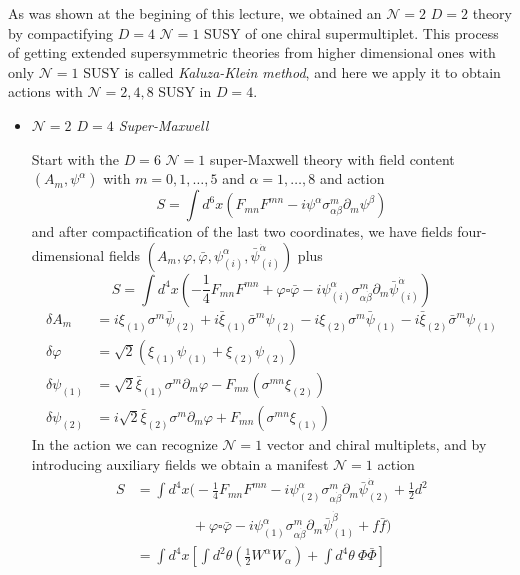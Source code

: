 \documentclass[a4paper,12pt]{article}
\numberwithin{equation}{section}
\numberwithin{exe}{section}
\newcommand{\p}{{\partial}}
\renewcommand{\a}{{\alpha}}
\newcommand{\ad}{{\dot\alpha}}
\renewcommand{\b}{{\beta}}
\newcommand{\bd}{{\dot\beta}}
\renewcommand{\d}{{\delta}}
\newcommand{\s}{{\sigma}}
\renewcommand{\sb}{{\bar\sigma}}
\renewcommand{\t}{{\theta}}
\newcommand{\vphi}{{\varphi}}
\newcommand{\vphib}{{\bar\varphi}}
\newcommand{\xib}{{\bar\xi}}
\newcommand{\Phib}{{\bar \Phi}}
\newcommand{\psib}{{\bar\psi}}
\begin{document}
As was shown at the begining of this lecture, we obtained an $\mathcal N=2$ $D=2$ theory by compactifying $D=4$ $\mathcal N=1$ SUSY of one chiral supermultiplet. This process of getting extended supersymmetric theories from higher dimensional ones with only $\mathcal N=1$ SUSY is called {\it Kaluza-Klein method}, and here we apply it to obtain actions with $\mathcal N=2,4,8$ SUSY in $D=4$.

	\begin{itemize}
	\item {\it $\mathcal N =2$ $D=4$ Super-Maxwell}
	
	Start with the $D=6$ $\mathcal N=1$ super-Maxwell theory with field content $(A_m, \psi^\a)$ with $m=0,1,\ldots,5$ and $\a =1,\ldots, 8$ and action
	\begin{equation}
	S = \int d^6x (F_{mn} F^{mn} -i\psi^\a \s^m_{\a\b} \p_m \psi^\b)
	\end{equation}
	and after compactification of the last two coordinates, we have fields four-dimensional fields $(A_m, \vphi,\vphib, \psi^\a_{(i)},\psib^\ad_{(i)})$ plus
	\begin{equation}
	S = \int d^4x (-\frac14 F_{mn}F^{mn} + \vphi\square \vphib - i \psi^\a_{(i)}\s^m_{\a\bd} \p_m \psib^\ad_{(i)})
	\end{equation}
	\begin{equation}\label{extsusy}
		\begin{aligned}
		\d A_m & = i\xi_{(1)} \s^m \psib_{(2)} + i\xib_{(1)}\sb^m \psi_{(2)} - i\xi_{(2)}\s^m \psib_{(1)} - i\xib_{(2)}\sb^m\psi_{(1)} \\
		\d\vphi & = \sqrt 2 (\xi_{(1)} \psi_{(1)} + \xi_{(2)} \psi_{(2)}) \\
		\d \psi_{(1)} & = \sqrt 2 \xib_{(1)} \s^m \p_m\vphi - F_{mn} (\s^{mn} \xi_{(2)}) \\
		\d \psi_{(2)} & = i \sqrt{2} \xib_{(2)}\s^m \p_m\vphi + F_{mn} (\s^{mn} \xi_{(1)})
		\end{aligned}
	\end{equation}
	In the action we can recognize $\mathcal N=1$ vector and chiral multiplets, and by introducing auxiliary fields we obtain a manifest $\mathcal N =1$ action
	\begin{align}
	S & = \int d^4x \Big(-\frac14 F_{mn}F^{mn} - i\psi^\a_{(2)} \s^m_{\a\bd}\p_m \psib^\ad_{(2)} + \frac12 d^2 \nonumber \\
	& \qquad\qquad + \vphi\square\vphib - i\psi^\a_{(1)}\s^m_{\a\bd}\p_m\psib^\bd_{(1)} + f\bar f \Big) \nonumber \\
	& = \int d^4x\left[ \int d^2\t\left(\frac12 W^\a W_\a\right) + \int d^4\t\ \Phi\Phib \right]
	\end{align}


\end{itemize}
\end{document}
